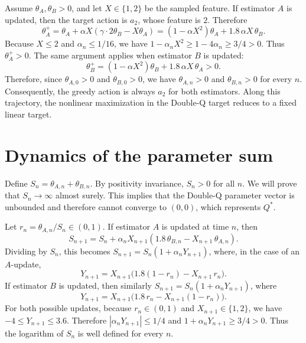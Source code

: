 \documentclass[11pt]{article}
\begin{document}
Assume $\theta_A, \theta_B > 0$, and let $X \in \{1, 2\}$ be the sampled feature. If estimator $A$ is updated, then the target action is $a_2$, whose feature is $2$. Therefore
\begin{equation}\label{eq:update-expanded}
\theta_A^+ = \theta_A + \alpha X(\gamma \cdot 2\theta_B - X\theta_A)
= (1 - \alpha X^2)\theta_A + 1.8\,\alpha X\,\theta_B.
\end{equation}
Because $X \leq 2$ and $\alpha_n \leq 1/16$, we have $1 - \alpha_n X^2 \geq 1 - 4\alpha_n \geq 3/4 > 0$. Thus $\theta_A^+ > 0$. The same argument applies when estimator $B$ is updated:
\begin{equation}
\theta_B^+ = (1 - \alpha X^2)\theta_B + 1.8\,\alpha X\,\theta_A > 0.
\end{equation}
Therefore, since $\theta_{A,0} > 0$ and $\theta_{B,0} > 0$, we have $\theta_{A,n} > 0$ and $\theta_{B,n} > 0$ for every $n$. Consequently, the greedy action is always $a_2$ for both estimators. Along this trajectory, the nonlinear maximization in the Double-Q target reduces to a fixed linear target.

\section{Dynamics of the parameter sum}

Define $S_n = \theta_{A,n} + \theta_{B,n}$. By positivity invariance, $S_n > 0$ for all $n$. We will prove that $S_n \to \infty$ almost surely. This implies that the Double-Q parameter vector is unbounded and therefore cannot converge to $(0,0)$, which represents $Q^*$.

Let $r_n = \theta_{A,n} / S_n \in (0,1)$. If estimator $A$ is updated at time $n$, then
\begin{equation}
S_{n+1} = S_n + \alpha_n X_{n+1}(1.8\,\theta_{B,n} - X_{n+1}\,\theta_{A,n}).
\end{equation}
Dividing by $S_n$, this becomes $S_{n+1} = S_n(1 + \alpha_n Y_{n+1})$, where, in the case of an $A$-update,
\begin{equation}\label{eq:y-a-update}
Y_{n+1} = X_{n+1}\bigl(1.8(1 - r_n) - X_{n+1}\,r_n\bigr).
\end{equation}
If estimator $B$ is updated, then similarly $S_{n+1} = S_n(1 + \alpha_n Y_{n+1})$, where
\begin{equation}\label{eq:y-b-update}
Y_{n+1} = X_{n+1}\bigl(1.8\,r_n - X_{n+1}(1 - r_n)\bigr).
\end{equation}
For both possible updates, because $r_n \in (0,1)$ and $X_{n+1} \in \{1, 2\}$, we have $-4 \leq Y_{n+1} \leq 3.6$. Therefore $|\alpha_n Y_{n+1}| \leq 1/4$ and $1 + \alpha_n Y_{n+1} \geq 3/4 > 0$. Thus the logarithm of $S_n$ is well defined for every $n$.
\end{document}
